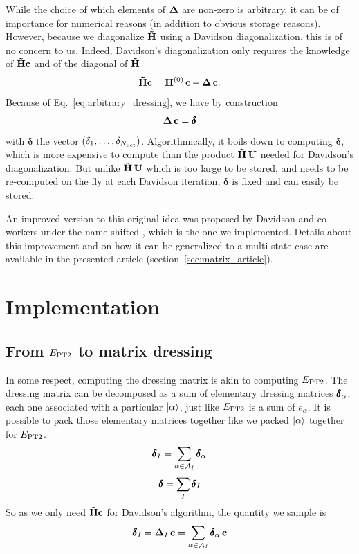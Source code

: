 \documentclass[./thesis.tex]{subfiles}
\begin{document}
While the choice of which elements of ${\bf \Delta}$ are non-zero is arbitrary, it can be of importance for numerical reasons (in addition to obvious storage reasons). However, because we diagonalize ${\bf \tilde H}$ using a Davidson diagonalization, this is of no concern to us. Indeed, Davidson's diagonalization only requires the knowledge of ${\bf \tilde H} {\bf c}$ and of the diagonal of ${\bf \tilde H}$ 
\begin{equation}
{\bf \tilde H} {\bf c} = {\bf H}^{(0)}\, {\bf c} + {\bf \Delta}\, {\bf c}.
\end{equation}
Because of Eq.~\eqref{eq:arbitrary_dressing}, we have by construction
\begin{equation}
{\bf \Delta}\, {\bf c} = {\pmb \delta}
\end{equation}
with ${\pmb \delta}$ the vector $\qty(\delta_1, \ldots, \delta_{{N_\text{det}}})$.
Algorithmically, it boils down to computing ${\pmb \delta}$, which is more expensive to compute than the product ${\bf \tilde H}\,{\bf U}$ needed for Davidson's diagonalization. But unlike ${\bf \tilde H}\,{\bf U}$ which is too large to be stored, and needs to be re-computed on the fly at each Davidson iteration, ${\pmb \delta}$ is fixed and can easily be stored.


An improved version to this original idea was proposed by Davidson and co-workers under the name shifted-\Bk,\cite{Nitzsche_1978a, Nitzsche_1978b, Rawlings_1983, Kozlowski_1995, Kozlowski_1994a, Kozlowski_1994b, Kozlowski_1994c} which is the one we implemented. Details about this improvement and on how it can be generalized to a multi-state case are available in the presented article (section~\ref{sec:matrix_article}).



\section{Implementation}

\subsection{From $E_\text{PT2}$ to matrix dressing}

In some respect, computing the dressing matrix is akin to computing $E_\text{PT2}$. The dressing matrix can be decomposed as a sum of elementary dressing matrices $\pmb \delta_\alpha$, each one associated with a particular $\ket \alpha$, just like $E_\text{PT2}$ is a sum of $e_\alpha$. It is possible to pack those elementary matrices together like we packed $\ket \alpha$ together for $E_\text{PT2}$.
\begin{equation}
\pmb \delta_I = \sum_{\alpha \in \mathcal{A}_I} \pmb \delta_\alpha
\end{equation}
\begin{equation}
\pmb \delta = \sum_{I} \pmb \delta_I
\end{equation}
So as we only need $\tilde{\bf H}{\bf c}$ for Davidson's algorithm, the quantity we sample is 
\begin{equation}
\pmb \delta_I = {\bf \Delta}_I\, {\bf c} = \sum_{\alpha \in \mathcal{A}_I} \pmb \delta_\alpha\, {\bf c}
\end{equation}
\end{document}
